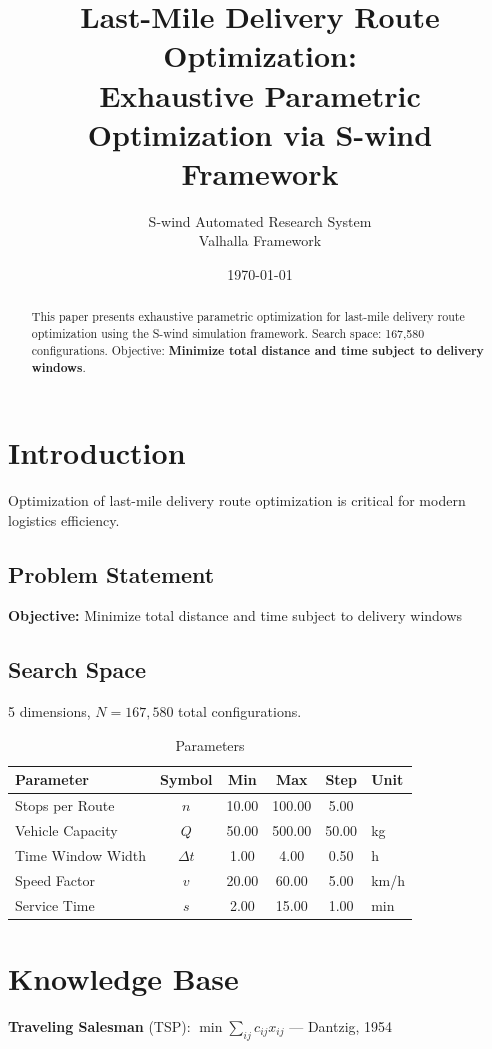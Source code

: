 \documentclass[11pt,twocolumn]{article}
\title{Last-Mile Delivery Route Optimization: \\Exhaustive Parametric Optimization via S-wind Framework}
\author{S-wind Automated Research System\\Valhalla Framework}
\date{\today}
\begin{document}
\maketitle

\begin{abstract}
This paper presents exhaustive parametric optimization for last-mile delivery route optimization using the S-wind simulation framework.
Search space: 167,580 configurations. Objective: \textbf{Minimize total distance and time subject to delivery windows}.
\end{abstract}

\section{Introduction}
Optimization of last-mile delivery route optimization is critical for modern logistics efficiency.

\subsection{Problem Statement}
\textbf{Objective:} Minimize total distance and time subject to delivery windows

\subsection{Search Space}
5 dimensions, $N = 167,580$ total configurations.

\begin{table}[h]
\centering
\caption{Parameters}
\begin{tabular}{@{}lccccl@{}}
\toprule
Parameter & Symbol & Min & Max & Step & Unit \\
\midrule
Stops per Route & $n$ & 10.00 & 100.00 & 5.00 &  \\
Vehicle Capacity & $Q$ & 50.00 & 500.00 & 50.00 & kg \\
Time Window Width & $\Delta t$ & 1.00 & 4.00 & 0.50 & h \\
Speed Factor & $v$ & 20.00 & 60.00 & 5.00 & km/h \\
Service Time & $s$ & 2.00 & 15.00 & 1.00 & min \\
\bottomrule
\end{tabular}
\end{table}

\section{Knowledge Base}
\textbf{Traveling Salesman} (TSP): $\min \sum_{ij} c_{ij} x_{ij}$ --- Dantzig, 1954
\end{document}
